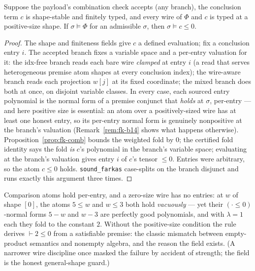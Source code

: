 \begin{bprop}\label{prop:fk-sound}
Suppose the payload's combination check accepts (any branch), the
conclusion term $c$ is shape-stable and finitely typed, and every wire
of $\Phi$ and $c$ is typed at a positive-size shape. If
$\sigma \models \Phi$ for an admissible $\sigma$, then
$\sigma \models c \leq 0$.
\end{bprop}
\begin{proof}
The shape and finiteness fields give $c$ a defined evaluation; fix a
conclusion entry $i$. The accepted branch fixes a variable space and a
per-entry valuation for it: the idx-free branch reads each bare wire
\emph{clamped} at entry $i$ (a read that serves heterogeneous premise
atom shapes at every conclusion index); the wire-aware branch reads
each projection $w[j]$ at its fixed coordinate; the mixed branch does
both at once, on disjoint variable classes. In every case, each
sourced entry polynomial is the normal form of a premise conjunct that
\emph{holds} at $\sigma$, per-entry --- and here positive size is
essential: an atom over a positively-sized wire has at least one
honest entry, so its per-entry normal form is genuinely nonpositive at
the branch's valuation (Remark~\ref{rem:fk-b14} shows what happens
otherwise). Proposition~\ref{prop:fk-comb} bounds the weighted fold by
$0$; the certified fold identity says the fold \emph{is} $c$'s
polynomial in the branch's variable space; evaluating at the branch's
valuation gives entry $i$ of $c$'s tensor $\leq 0$. Entries were
arbitrary, so the atom $c \leq 0$ holds. \texttt{sound\_farkas}
case-splits on the branch disjunct and runs exactly this argument
three times.
\end{proof}

\begin{bremark}
\label{rem:fk-b14}
Comparison atoms hold per-entry, and a zero-size wire has no entries:
at $w$ of shape $[0]$, the atoms $5 \leq w$ and $w \leq 3$ both hold
\emph{vacuously} --- yet their $({\cdot} \leq 0)$-normal forms
$5 - w$ and $w - 3$ are perfectly good polynomials, and with
$\lambda = 1$ each they fold to the constant $2$. Without the
positive-size condition the rule derives $\vdash 2 \leq 0$ from a
satisfiable premise: the classic mismatch between empty-product
semantics and nonempty algebra, and the reason the field exists. (A
narrower wire discipline once masked the failure by accident of
strength; the field is the honest general-shape guard.)
\end{bremark}

